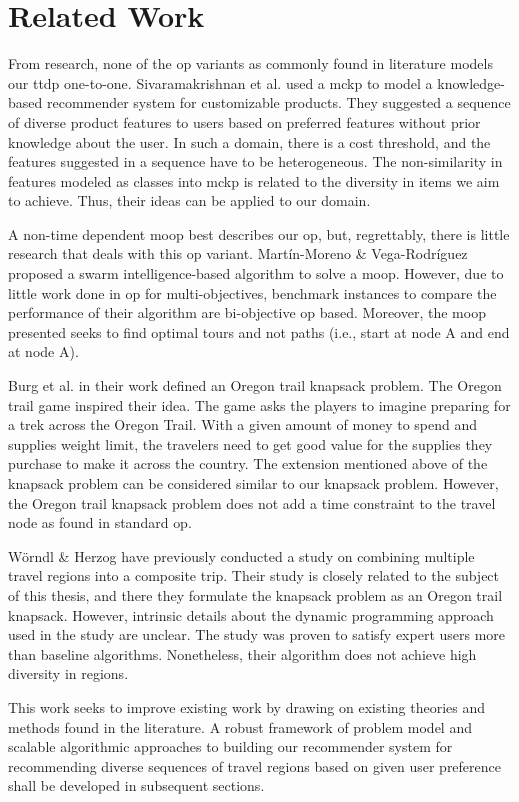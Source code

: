 \section{Related Work}
From research, none of the \gls{op} variants as commonly found in literature models our \gls{ttdp} one-to-one. Sivaramakrishnan et al.\parencite{MCKP_CustomProducts} used a \gls{mckp} to model a knowledge-based recommender system for customizable products. They suggested a sequence of diverse product features to users based on preferred features without prior knowledge about the user. In such a domain, there is a cost threshold, and the features suggested in a sequence have to be heterogeneous. The non-similarity in features modeled as classes into \gls{mckp} is related to the diversity in items we aim to achieve. Thus, their ideas can be applied to our domain. 

A non-time dependent \gls{moop} best describes our \gls{op}, but, regrettably, there is little research that deals with this \gls{op} variant. Martín-Moreno \& Vega-Rodríguez\parencite{Martin-Moreno2018Multi-ObjectiveProblem} proposed a swarm intelligence-based algorithm to solve a \gls{moop}. However, due to little work done in \gls{op} for multi-objectives, benchmark instances to compare the performance of their algorithm are bi-objective \gls{op} based. Moreover, the \gls{moop} presented seeks to find optimal tours and not paths (i.e., start at node A and end at node A).

Burg et al.\parencite{Oregon_Trail_Knapsack} in their work defined an Oregon trail knapsack problem. The Oregon trail game inspired their idea. The game asks the players to imagine preparing for a trek across the Oregon Trail. With a given amount of money to spend and supplies weight limit, the travelers need to get good value for the supplies they purchase to make it across the country. The extension mentioned above of the knapsack problem can be considered similar to our knapsack problem. However, the Oregon trail knapsack problem does not add a time constraint to the travel node as found in standard \gls{op}. 

Wörndl \& Herzog\parencite{cbrecsys2014} have previously conducted a study on combining multiple travel regions into a composite trip. Their study is closely related to the subject of this thesis, and there they formulate the knapsack problem as an Oregon trail knapsack. However, intrinsic details about the dynamic programming approach used in the study are unclear. The study was proven to satisfy expert users more than baseline algorithms. Nonetheless, their algorithm does not achieve high diversity in regions\parencite{cbrecsys2014}.

This work seeks to improve existing work by drawing on existing theories and methods found in the literature. A robust framework of problem model and scalable algorithmic approaches to building our recommender system for recommending diverse sequences of travel regions based on given user preference shall be developed in subsequent sections.
